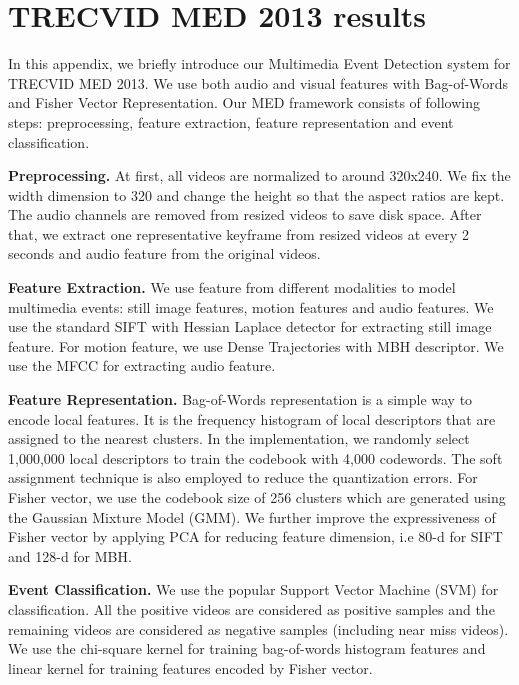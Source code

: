 \chapter{TRECVID MED 2013 results} 

\ifpdf
\graphicspath{{Appendix1/Figs/Raster/}{Appendix1/Figs/PDF/}{Appendix1/Figs/}}
\else
\graphicspath{{Appendix1/Figs/Vector/}{Appendix1/Figs/}}
\fi

In this appendix, we briefly introduce our Multimedia Event Detection system for TRECVID MED 2013. We use both audio and visual features with Bag-of-Words and Fisher Vector Representation. Our MED framework consists of following steps: preprocessing, feature extraction, feature representation and event classification.

\textbf{Preprocessing.} At first, all videos are normalized to around 320x240. We fix the width dimension to 320 and change the height so that the aspect ratios are kept. The audio channels are removed from resized videos to save disk space. After that, we extract one representative keyframe from resized videos at every 2 seconds and audio feature from the original videos. 

\textbf{Feature Extraction.} We use feature from different modalities to model multimedia events: still image features, motion features and audio features. We use the standard SIFT with Hessian Laplace detector for extracting still image feature. For motion feature, we use Dense Trajectories with MBH descriptor. We use the MFCC for extracting audio feature. 

\textbf{Feature Representation.} Bag-of-Words representation is a simple way to encode local features. It is the frequency histogram of local descriptors that are assigned to the nearest clusters. In the implementation, we randomly select 1,000,000 local descriptors to train the codebook with 4,000 codewords. The soft assignment technique is also employed to reduce the quantization errors. For Fisher vector, we use the codebook size of 256 clusters which are generated using the Gaussian Mixture Model (GMM). We further improve the expressiveness of Fisher vector by applying PCA for reducing feature dimension, i.e 80-d for SIFT and 128-d for MBH. 

\textbf{Event Classification.}
We use the popular Support Vector Machine (SVM) for classification. All the positive videos are considered as positive samples and the remaining videos are considered as negative samples (including near miss videos). We use the chi-square kernel for training bag-of-words histogram features and linear kernel for training features encoded by Fisher vector.


